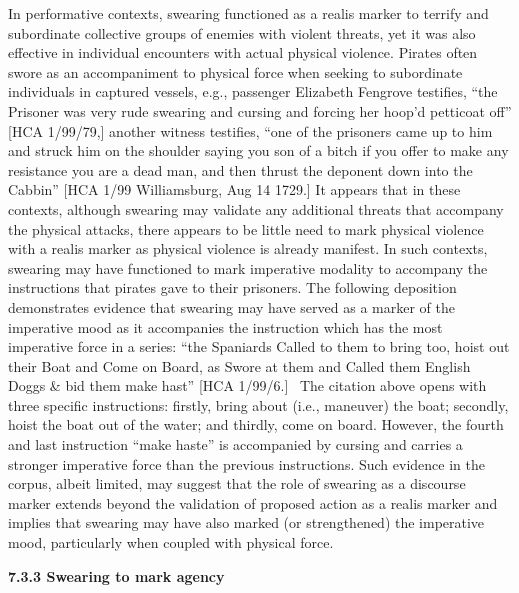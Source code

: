 \begin{styleStandard}
In performative contexts, swearing functioned as a realis marker to terrify and subordinate collective groups of enemies with violent threats, yet it was also effective in individual encounters with actual physical violence. Pirates often swore as an accompaniment to physical force when seeking to subordinate individuals in captured vessels, e.g., passenger Elizabeth Fengrove testifies, “the Prisoner was very rude swearing and cursing and forcing her hoop’d petticoat off” [HCA 1/99/79,] another witness testifies, “one of the prisoners came up to him and struck him on the shoulder saying you son of a bitch if you offer to make any resistance you are a dead man, and then thrust the deponent down into the Cabbin” [HCA 1/99 Williamsburg, Aug 14 1729.] It appears that in these contexts, although swearing may validate any additional threats that accompany the physical attacks, there appears to be little need to mark physical violence with a realis marker as physical violence is already manifest. In such contexts, swearing may have functioned to mark imperative modality to accompany the instructions that pirates gave to their prisoners. The following deposition demonstrates evidence that swearing may have served as a marker of the imperative mood as it accompanies the instruction which has the most imperative force in a series: “the Spaniards Called to them to bring too, hoist out their Boat and Come on Board, as Swore at them and Called them English Doggs \& bid them make hast” [HCA 1/99/6.] ~The citation above opens with three specific instructions: firstly, bring about (i.e., maneuver) the boat; secondly, hoist the boat out of the water; and thirdly, come on board. However, the fourth and last instruction “make haste” is accompanied by cursing and carries a stronger imperative force than the previous instructions. Such evidence in the corpus, albeit limited, may suggest that the role of swearing as a discourse marker extends beyond the validation of proposed action as a realis marker and implies that swearing may have also marked (or strengthened) the imperative mood, particularly when coupled with physical force. 
\end{styleStandard}


\begin{styleStandard}
\textbf{7.3.3 Swearing to mark agency}
\end{styleStandard}


